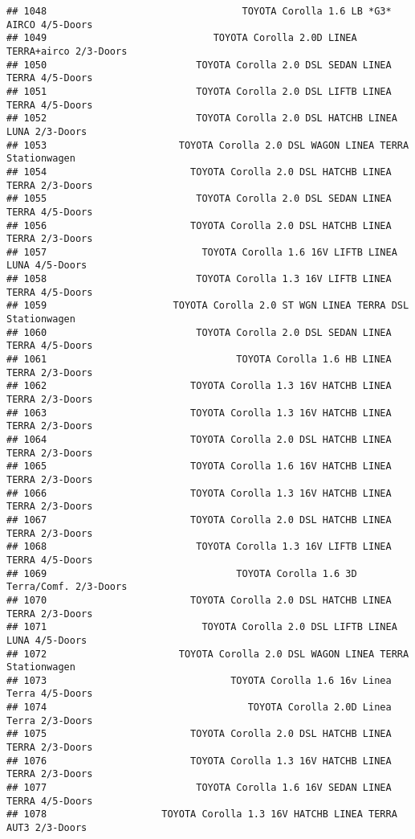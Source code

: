 \documentclass[]{article}
\begin{document}
\begin{verbatim}
## 1048                                  TOYOTA Corolla 1.6 LB *G3* AIRCO 4/5-Doors
## 1049                             TOYOTA Corolla 2.0D LINEA TERRA+airco 2/3-Doors
## 1050                          TOYOTA Corolla 2.0 DSL SEDAN LINEA TERRA 4/5-Doors
## 1051                          TOYOTA Corolla 2.0 DSL LIFTB LINEA TERRA 4/5-Doors
## 1052                          TOYOTA Corolla 2.0 DSL HATCHB LINEA LUNA 2/3-Doors
## 1053                       TOYOTA Corolla 2.0 DSL WAGON LINEA TERRA Stationwagen
## 1054                         TOYOTA Corolla 2.0 DSL HATCHB LINEA TERRA 2/3-Doors
## 1055                          TOYOTA Corolla 2.0 DSL SEDAN LINEA TERRA 4/5-Doors
## 1056                         TOYOTA Corolla 2.0 DSL HATCHB LINEA TERRA 2/3-Doors
## 1057                           TOYOTA Corolla 1.6 16V LIFTB LINEA LUNA 4/5-Doors
## 1058                          TOYOTA Corolla 1.3 16V LIFTB LINEA TERRA 4/5-Doors
## 1059                      TOYOTA Corolla 2.0 ST WGN LINEA TERRA DSL Stationwagen
## 1060                          TOYOTA Corolla 2.0 DSL SEDAN LINEA TERRA 4/5-Doors
## 1061                                 TOYOTA Corolla 1.6 HB LINEA TERRA 2/3-Doors
## 1062                         TOYOTA Corolla 1.3 16V HATCHB LINEA TERRA 2/3-Doors
## 1063                         TOYOTA Corolla 1.3 16V HATCHB LINEA TERRA 2/3-Doors
## 1064                         TOYOTA Corolla 2.0 DSL HATCHB LINEA TERRA 2/3-Doors
## 1065                         TOYOTA Corolla 1.6 16V HATCHB LINEA TERRA 2/3-Doors
## 1066                         TOYOTA Corolla 1.3 16V HATCHB LINEA TERRA 2/3-Doors
## 1067                         TOYOTA Corolla 2.0 DSL HATCHB LINEA TERRA 2/3-Doors
## 1068                          TOYOTA Corolla 1.3 16V LIFTB LINEA TERRA 4/5-Doors
## 1069                                 TOYOTA Corolla 1.6 3D Terra/Comf. 2/3-Doors
## 1070                         TOYOTA Corolla 2.0 DSL HATCHB LINEA TERRA 2/3-Doors
## 1071                           TOYOTA Corolla 2.0 DSL LIFTB LINEA LUNA 4/5-Doors
## 1072                       TOYOTA Corolla 2.0 DSL WAGON LINEA TERRA Stationwagen
## 1073                                TOYOTA Corolla 1.6 16v Linea Terra 4/5-Doors
## 1074                                   TOYOTA Corolla 2.0D Linea Terra 2/3-Doors
## 1075                         TOYOTA Corolla 2.0 DSL HATCHB LINEA TERRA 2/3-Doors
## 1076                         TOYOTA Corolla 1.3 16V HATCHB LINEA TERRA 2/3-Doors
## 1077                          TOYOTA Corolla 1.6 16V SEDAN LINEA TERRA 4/5-Doors
## 1078                    TOYOTA Corolla 1.3 16V HATCHB LINEA TERRA AUT3 2/3-Doors

\end{verbatim}
\end{document}
